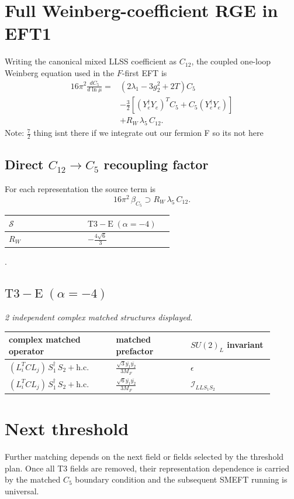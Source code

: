 \documentclass[9pt]{article}
\begin{document}
\section*{Full Weinberg-coefficient RGE in EFT1}
Writing the canonical mixed LLSS coefficient as $C_{12}$, the coupled one-loop Weinberg equation used in the $F$-first EFT is
\begin{align}
16\pi^2\frac{dC_5}{d\ln\mu}={}&(2\lambda_1-3g_2^2+2T)C_5\\
&-\frac32\left[(Y_e^\dagger Y_e)^T C_5+C_5(Y_e^\dagger Y_e)\right]\\
&+R_W\,\lambda_5\,C_{12}.
\end{align}
Note: $\frac{7}{2}$ thing isnt there if we integrate out our fermion F so its not here \subsection*{Direct $C_{12}\to C_5$ recoupling factor}
For each representation the source term is
\[16\pi^2\,\beta_{C_5}\supset R_W\,\lambda_5\,C_{12}.\]
\begin{longtable}{@{}p{0.37\linewidth}p{0.19\linewidth}@{}}
\toprule
$\mathcal{S}$ & $ \mathrm{T3-E}\;(\alpha=-4) $ \\
\midrule
$R_W$ & $ - \frac{4 \sqrt{6}}{3} $ \\
\bottomrule
\end{longtable}
.
\subsection*{$ \mathrm{T3-E}\;(\alpha=-4) $}
\textit{2 independent complex matched structures displayed. }
\begin{longtable}{@{}p{0.36\linewidth}p{0.25\linewidth}p{0.29\linewidth}@{}}
\toprule
complex matched operator & matched prefactor & $SU(2)_L$ invariant \\
\midrule
$ (L_i^T C L_j)\,S_1^\dagger\,S_2+\mathrm{h.c.} $ & $ \frac{\sqrt{3} \overline{y_{1}} \overline{y_{2}}}{3 M_F} $ & $ \epsilon $ \\
$ (L_i^T C L_j)\,S_1^\dagger\,S_2+\mathrm{h.c.} $ & $ \frac{\sqrt{6} \overline{y_{1}} \overline{y_{2}}}{3 M_F} $ & $ \mathcal{I}_{LLS_1S_2} $ \\
\bottomrule
\end{longtable}
\section*{Next threshold}
Further matching depends on the next field or fields selected by the threshold plan.  Once all T3 fields are removed, their representation dependence is carried by the matched $C_5$ boundary condition and the subsequent SMEFT running is universal.
\end{document}
